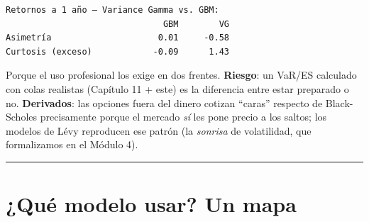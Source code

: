 \documentclass[
  spanish,
  letterpaper,
  DIV=11,
  numbers=noendperiod]{scrreprt}
\begin{document}
\begin{verbatim}
Retornos a 1 año — Variance Gamma vs. GBM:
                               GBM        VG
Asimetría                     0.01     -0.58
Curtosis (exceso)            -0.09      1.43
\end{verbatim}

\begin{tcolorbox}[enhanced jigsaw, bottomrule=.15mm, colback=white, opacitybacktitle=0.6, arc=.35mm, toprule=.15mm, opacityback=0, breakable, titlerule=0mm, left=2mm, coltitle=black, colbacktitle=quarto-callout-note-color!10!white, colframe=quarto-callout-note-color-frame, leftrule=.75mm, toptitle=1mm, bottomtitle=1mm, title=\textcolor{quarto-callout-note-color}{\faInfo}\hspace{0.5em}{¿Por qué molestarse con estos modelos?}, rightrule=.15mm]

Porque el uso profesional los exige en dos frentes. \textbf{Riesgo}: un
VaR/ES calculado con colas realistas (Capítulo 11 + este) es la
diferencia entre estar preparado o no. \textbf{Derivados}: las opciones
fuera del dinero cotizan ``caras'' respecto de Black-Scholes
precisamente porque el mercado \emph{sí} les pone precio a los saltos;
los modelos de Lévy reproducen ese patrón (la \emph{sonrisa} de
volatilidad, que formalizamos en el Módulo 4).

\end{tcolorbox}

\begin{center}\rule{0.5\linewidth}{0.5pt}\end{center}

\chapter{¿Qué modelo usar? Un mapa}\label{quuxe9-modelo-usar-un-mapa}
\end{document}

